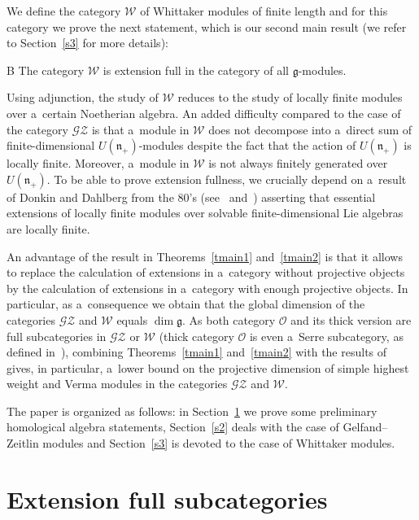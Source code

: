 \documentclass[pdftex]{sigma}
\begin{document}
We def\/ine the category $\mathscr{W}$ of Whittaker modules of f\/inite length and for this category we prove the next
statement, which is our second main result (we refer to Section~\ref{s3} for more details):

\begin{customthm}{B}
\label{tmain2}
The category $\mathscr{W}$ is extension full in the category of all $\mathfrak{g}$-modules.
\end{customthm}

Using adjunction, the study of $\mathscr{W}$ reduces to the study of locally f\/inite modules over a~certain Noetherian
algebra.
An added dif\/f\/iculty compared to the case of the category $\mathscr{G}\mathscr{Z}$ is that a~module in $\mathscr{W}$ does
not decompose into a~direct sum of f\/inite-dimensional $U(\mathfrak{n}_+)$-modules despite the fact that the action of
$U(\mathfrak{n}_+)$ is locally f\/inite.
Moreover, a~module in $\mathscr{W}$ is not always f\/initely generated over $U(\mathfrak{n}_+)$.
To be able to prove extension fullness, we crucially depend on a~result of Donkin and Dahlberg from the 80's
(see~\cite{Do} and~\cite{Da}) asserting that essential extensions of locally f\/inite modules over solvable f\/inite-dimensional Lie algebras are locally f\/inite.

An advantage of the result in Theorems~\ref{tmain1} and~\ref{tmain2} is that it allows to replace the calculation of
extensions in a~category without projective objects by the calculation of extensions in a~category with enough
projective objects.
In particular, as a~consequence we obtain that the global dimension of the categories $\mathscr{G}\mathscr{Z}$ and
$\mathscr{W}$ equals $\dim\mathfrak{g}$.
As both category $\mathcal{O}$ and its thick version are full subcategories in $\mathscr{G}\mathscr{Z}$ or $\mathscr{W}$
(thick category $\mathcal{O}$ is even a~Serre subcategory, as def\/ined in~\cite[Subsection~10.3.2]{We}), combining
Theorems~\ref{tmain1} and~\ref{tmain2} with the results of~\cite{CoMa} gives, in particular, a~lower bound on the
projective dimension of simple highest weight and Verma modules in the categories $\mathscr{G}\mathscr{Z}$ and $\mathscr{W}$.

The paper is organized as follows: in Section~\ref{s1} we prove some preliminary homological algebra statements,
Section~\ref{s2} deals with the case of Gelfand--Zeitlin modules and Section~\ref{s3} is devoted to the case of
Whittaker modules.

\section{Extension full subcategories}\label{s1}
\end{document}
